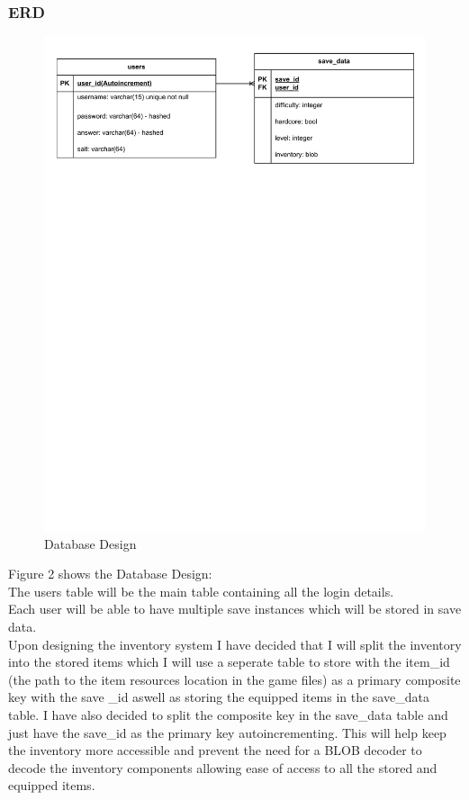 \documentclass{article}
\begin{document}
        \subsubsection{ERD}
        \begin{figure}[H]
                \centering
                \includegraphics[width=\textwidth, trim = 0 575 0 25, clip]{images/design/Database_Design.pdf}
                \caption{Database Design}
        \end{figure}
        Figure 2 shows the Database Design:\\
        The users table will be the main table containing all the login details.\\
        Each user will be able to have multiple save instances which will be stored in save data.\\
        Upon designing the inventory system I have decided that I will split the inventory into the stored items which I will use a seperate table to store with the item\_id (the path to the item resources location in the game files) as a primary composite key with the save \_id aswell as storing the equipped items in the save\_data table. I have also decided to split the composite key in the save\_data table and just have the save\_id as the primary key autoincrementing. This will help keep the inventory more accessible and prevent the need for a BLOB decoder to decode the inventory components allowing ease of access to all the stored and equipped items.\\
\end{document}
